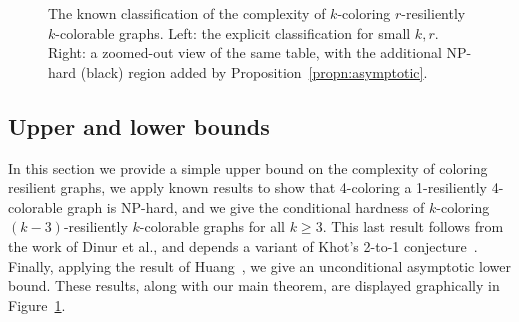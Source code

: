 \documentclass{llncs}
\begin{document}
\begin{figure}
\centering
\begin{subfigure}{.65\textwidth}
  \centering
\end{subfigure}%
\begin{subfigure}{.35\textwidth}
  \centering
\end{subfigure}
\caption{The known classification of the complexity of $k$-coloring
$r$-resiliently $k$-colorable graphs. Left: the explicit classification for
small $k, r$. Right: a zoomed-out view of the same table, with the additional
NP-hard (black) region added by Proposition~\ref{propn:asymptotic}.}
\label{fig:classification} \end{figure}

\subsection{Upper and lower bounds} \label{sec:easy-bounds}
In this section we provide a simple upper bound on the complexity of coloring
resilient graphs, we apply known results to show that 4-coloring a
1-resiliently 4-colorable graph is NP-hard, and we give the conditional hardness
of $k$-coloring $(k-3)$-resiliently $k$-colorable graphs for all $k \geq 3$.
This last result follows from the work of Dinur et al., and depends a variant
of Khot's 2-to-1 conjecture~\cite{DMR06}. Finally, applying the result of
Huang~\cite{Huang13}, we give an unconditional asymptotic lower bound. These
results, along with our main theorem, are displayed graphically in
Figure~\ref{fig:classification}.
\end{document}
